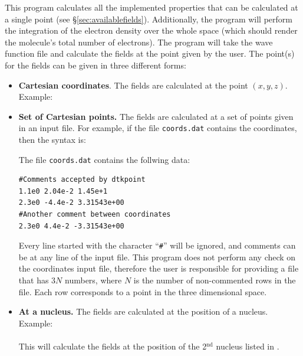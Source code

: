 This program calculates all the implemented properties that can be calculated at a single point (see \S \ref{sec:availablefields}). Additionally, the program will perform the integration of the electron density over the whole space (which should render the molecule's total number of electrons). The program will take the wave function file and calculate the fields at the point given by the user. The point(s) for the fields can be given in three different forms:
\begin{itemize}
   \item \textbf{Cartesian coordinates}. The fields are calculated at the point $(x,y,z)$. Example:\\
   \item \textbf{Set of Cartesian points.} The fields are calculated at a set of points given in an input file. For example, if the file \texttt{coords.dat} contains the coordinates, then the syntax is:\\
      
      The file \texttt{coords.dat} contains the follwing data:
      \begin{verbatim}
#Comments accepted by dtkpoint
1.1e0 2.04e-2 1.45e+1
2.3e0 -4.4e-2 3.31543e+00
#Another comment between coordinates
2.3e0 4.4e-2 -3.31543e+00
      \end{verbatim}
      Every line started with the character ``\texttt{\#}'' will be ignored, and comments can be at any line of the input file. This program does not perform any check on the coordinates input file, therefore the user is responsible for providing a file that has $3N$ numbers, where $N$ is the number of non-commented rows in the file. Each row corresponds to a point in the three dimensional space.
      \item \textbf{At a nucleus.} The fields are calculated at the position of a nucleus. Example:\\
         \\
   This will calculate the fields at the position of the 2$^{\textrm{nd}}$ nucleus listed in \wfexfile.
\end{itemize}


